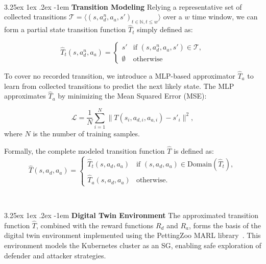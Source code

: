 \documentclass[conference]{IEEEtran}
\makeatletter
\renewcommand\paragraph{\@startsection{paragraph}{5}{\z@}%
  {3.25ex \@plus1ex \@minus.2ex}%
  {-1em}%
  {\normalfont\normalsize\bfseries}}
\makeatother
\begin{document}
\

\noindent \paragraph{\textbf{Transition Modeling}} Relying a representative set of collected transitions $\mathcal{T} = \langle(s, a_d^n, a_a, s')_{t\in \mathbb{N}, t \leq w}\rangle$ over a $w$ time window, we can form a partial state transition function $\hat{T}_t$ simply defined as:

$$
\hat{T}_t(s, a_d^n, a_a) =
\begin{cases}
s' & \text{if } (s, a_d^n, a_a, s') \in \mathcal{T}, \\
\emptyset & \text{otherwise}
\end{cases}
$$

To cover no recorded transition, we introduce a MLP-based approximator $\hat{T}_a$ to learn from collected transitions to predict the next likely state.
%
The MLP approximates $\hat{T}_a$ by minimizing the Mean Squared Error (MSE):

$$
\mathcal{L} = \frac{1}{N} \sum_{i=1}^N \|T(s_i, a_{d,i}, a_{a,i}) - s'_i\|^2,
$$
where $N$ is the number of training samples.

Formally, the complete modeled transition function $\hat{T}$ is defined as:
$$
\hat{T}(s, a_d, a_a) = 
\begin{cases} 
\hat{T}_t(s, a_d, a_a) & \text{if } (s, a_d, a_a) \in \text{Domain}(\hat{T}_t), \\
\hat{T}_a(s, a_d, a_a) & \text{otherwise}.
\end{cases}
$$


\

\noindent \paragraph{\textbf{Digital Twin Environment}} The approximated transition function $\hat{T}$, combined with the reward functions $R_d$ and $R_a$, forms the basis of the digital twin environment implemented using the PettingZoo MARL library~\cite{Terry2021}. This environment models the Kubernetes cluster as an SG, enabling safe exploration of defender and attacker strategies.
\end{document}
